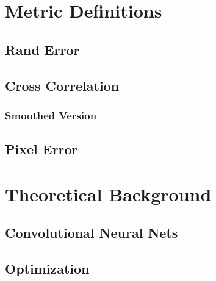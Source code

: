 \chapter{Metric Definitions}
\section{Rand Error}
\section{Cross Correlation}
\subsection{Smoothed Version}
\section{Pixel Error}

\chapter{Theoretical Background}
\section{Convolutional Neural Nets}
\section{Optimization}